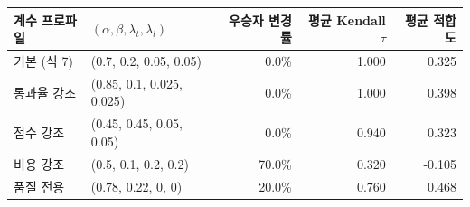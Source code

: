 \begin{tabular}{llrrr}
\hline
계수 프로파일 & $(\alpha,\beta,\lambda_t,\lambda_l)$ & 우승자 변경률 & 평균 Kendall $\tau$ & 평균 적합도 \\
\hline
기본 (식 7) & (0.7, 0.2, 0.05, 0.05) & 0.0\% & 1.000 & 0.325 \\
통과율 강조 & (0.85, 0.1, 0.025, 0.025) & 0.0\% & 1.000 & 0.398 \\
점수 강조 & (0.45, 0.45, 0.05, 0.05) & 0.0\% & 0.940 & 0.323 \\
비용 강조 & (0.5, 0.1, 0.2, 0.2) & 70.0\% & 0.320 & -0.105 \\
품질 전용 & (0.78, 0.22, 0, 0) & 20.0\% & 0.760 & 0.468 \\
\hline
\end{tabular}
